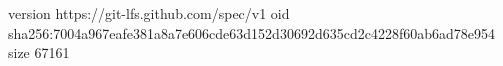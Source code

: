 version https://git-lfs.github.com/spec/v1
oid sha256:7004a967eafe381a8a7e606cde63d152d30692d635cd2c4228f60ab6ad78e954
size 67161
